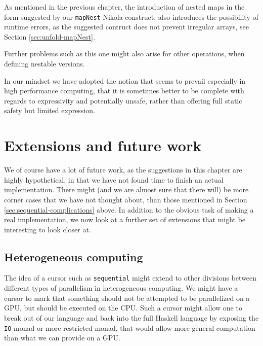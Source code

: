 As mentioned in the previous chapter, the introduction of nested maps
in the form suggested by our \lstinline{mapNest} Nikola-construct,
also introduces the possibility of runtime errors, as the suggested
contruct does not prevent irregular arrays, see Section \ref{sec:unfold-mapNest}.

Further problems such as this one might also arise for other
operations, when defining nestable versions.

In our mindset we have adopted the notion that seems to prevail especially in
high performance computing, that it is sometimes better to be complete with
regards to expressivity and potentially unsafe, rather than offering full
static safety but limited expression.



\section{Extensions and future work}
\label{sec:parallelism-future-work}

We of course have a lot of future work, as the suggestions in this
chapter are highly hypothetical, in that we have not found time to
finish an actual implementation. There might (and we are almost sure
that there will) be more corner cases that we have not thought about,
than those mentioned in Section \ref{sec:sequential-complications}
above. In addition to the obvious task of making a real
implementation, we now look at a further set of extensions that might
be interesting to look closer at.

\subsection{Heterogeneous computing}
The idea of a cursor such as \lstinline{sequential} might extend to
other divisions between different types of parallelism in
heterogeneous computing. We might have a cursor to mark that something
should not be attempted to be parallelized on a GPU, but should be
executed on the CPU. Such a cursor might allow one to break out of our
language and back into the full Haskell language by exposing the
\lstinline{IO}-monad or more restricted monad, that would allow more
general computation than what we can provide on a GPU.

